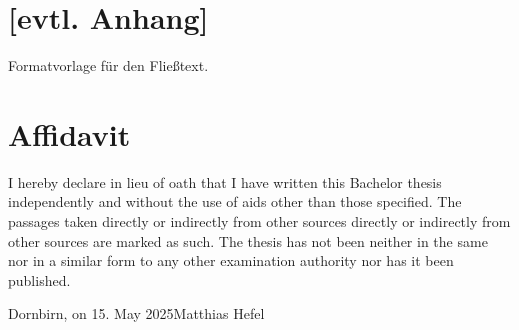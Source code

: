 \documentclass[a4paper,12pt,twoside]{scrreprt}
\begin{document}
\chapter*{[evtl. Anhang]}  %
Formatvorlage für den Fließtext.


\chapter*{Affidavit}
I hereby declare in lieu of oath that I have written this Bachelor
thesis independently and without the use of aids other than those specified. The passages taken directly or indirectly from other sources
directly or indirectly from other sources are marked as such. The thesis has not been
neither in the same nor in a similar form to any other examination authority
nor has it been published.

\vspace{3cm}
\noindent
Dornbirn, on 15. May 2025\hfill Matthias Hefel
\end{document}
